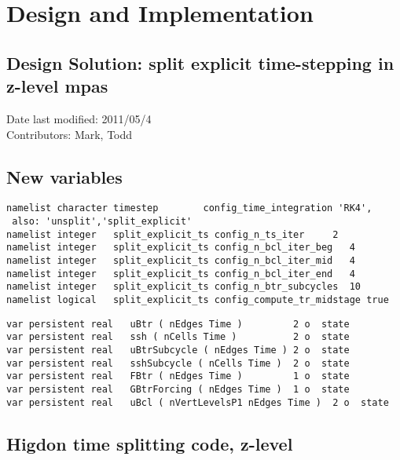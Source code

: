 \documentclass[11pt]{report}
\begin{document}

\chapter{Design and Implementation}

\section{Design Solution: split explicit time-stepping in z-level mpas}
Date last modified: 2011/05/4 \\
Contributors: Mark, Todd \\

\section{New variables}

\begin{verbatim}
namelist character timestep        config_time_integration 'RK4',
 also: 'unsplit','split_explicit'
namelist integer   split_explicit_ts config_n_ts_iter     2
namelist integer   split_explicit_ts config_n_bcl_iter_beg   4
namelist integer   split_explicit_ts config_n_bcl_iter_mid   4
namelist integer   split_explicit_ts config_n_bcl_iter_end   4
namelist integer   split_explicit_ts config_n_btr_subcycles  10
namelist logical   split_explicit_ts config_compute_tr_midstage true
\end{verbatim}


\begin{verbatim}
var persistent real   uBtr ( nEdges Time )         2 o  state
var persistent real   ssh ( nCells Time )          2 o  state 
var persistent real   uBtrSubcycle ( nEdges Time ) 2 o  state
var persistent real   sshSubcycle ( nCells Time )  2 o  state 
var persistent real   FBtr ( nEdges Time )         1 o  state 
var persistent real   GBtrForcing ( nEdges Time )  1 o  state
var persistent real   uBcl ( nVertLevelsP1 nEdges Time )  2 o  state 
\end{verbatim}


\newpage
\section{Higdon time splitting code, z-level}
\end{document}
